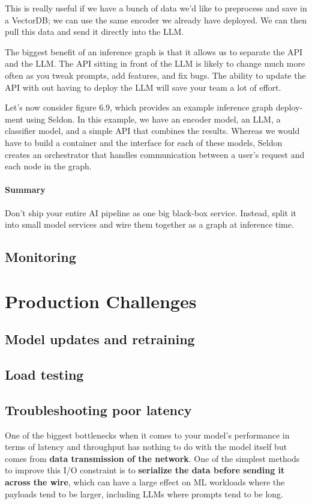 This is really useful if we have a bunch of data we'd like to preprocess and save in a VectorDB; we can use the same encoder we already have deployed. We can then pull this data and send it directly into the LLM.

The biggest benefit of an inference graph is that it allows us to separate the API and the LLM. The API sitting in front of the LLM is likely to change much more often as you tweak prompts, add features, and fix bugs. The ability to update the API with out having to deploy the LLM will save your team a lot of effort.

Let's now consider figure 6.9, which provides an example inference graph deploy- ment using Seldon. In this example, we have an encoder model, an LLM, a classifier model, and a simple API that combines the results. Whereas we would have to build a container and the interface for each of these models, Seldon creates an orchestrator that handles communication between a user's request and each node in the graph.

\paragraph{Summary} Don't ship your entire AI pipeline as one big black-box service. Instead, split it into small model services and wire them together as a graph at inference time.

\subsection{Monitoring}

\section{Production Challenges}

\subsection{Model updates and retraining}
\subsection{Load testing}
\subsection{Troubleshooting poor latency}

One of the biggest bottlenecks when it comes to your model's performance in terms of latency and throughput has nothing to do with the model itself but comes from \textbf{data transmission of the network}. One of the simplest methods to improve this I/O constraint is to \textbf{serialize the data before sending it across the wire}, which can have a large effect on ML workloads where the payloads tend to be larger, including LLMs where prompts tend to be long.

